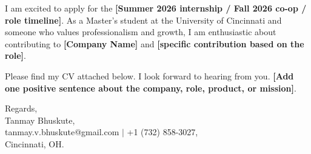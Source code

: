 \documentclass[11pt]{letter}
\begin{document}
\begin{letter}{}
I am excited to apply for the \textbf{[Summer 2026 internship / Fall 2026 co-op / role timeline]}. As a Master's student at the University of Cincinnati and someone who values professionalism and growth, I am enthusiastic about contributing to \textbf{[Company Name]} and \textbf{[specific contribution based on the role]}.

Please find my CV attached below. I look forward to hearing from you. \textbf{[Add one positive sentence about the company, role, product, or mission]}.

{\setlength{\parskip}{0pt}
Regards,\\
Tanmay Bhuskute,\\
tanmay.v.bhuskute@gmail.com $\mid$ +1 (732) 858-3027,\\
Cincinnati, OH.
}

\end{letter}
\end{document}
